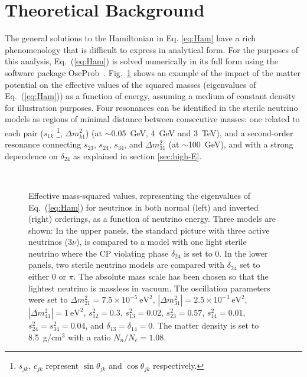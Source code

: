 \newcommand{\UNP}{U^{4\nu}}
\newcommand{\USM}{U^{3\nu}}

\section{Theoretical Background}
\label{sec:phenomeno}
The general solutions to the Hamiltonian in Eq. \ref{eq:Ham} have a rich phenomenology that is difficult to express in analytical form. For the purposes of this analysis, Eq.~(\ref{eq:Ham}) is solved numerically in its full form using the software package OscProb~\cite{OscProb}. Fig.~\ref{fig:massres} shows an example of the impact of the matter potential on the effective values of the squared masses (eigenvalues of Eq.~(\ref{eq:Ham})) as a function of energy, assuming a medium of constant density for illustration purposes. Four resonances can be identified in the sterile neutrino models as regions of minimal distance between consecutive masses: one related to each pair ($s_{1k}$ \footnote{$s_{jk}$, $c_{jk}$ represent $\sin\theta_{jk}$ and $\cos\theta_{jk}$ respectively.}, $\Delta{m^2_{k1}}$) (at $\sim$0.05~GeV, 4~GeV and 3~TeV), and a second-order resonance connecting $s_{23}$, $s_{24}$, $s_{34}$, and $\Delta{m^2_{31}}$ (at $\sim$100~GeV), and with a strong dependence on $\delta_{24}$ as explained in section \ref{sec:high-E}.
\begin{figure}
    \centering
    \\
    \caption{Effective mass-squared values, representing the eigenvalues of Eq.~(\ref{eq:Ham}) for neutrinos in both normal (left) and inverted (right) orderings, as a function of neutrino energy. Three models are shown: In the upper panels, the standard picture with three active neutrinos (3$\nu$), is compared to a model with one light sterile neutrino where the CP violating phase $\delta_{24}$ is set to $0$. In the lower panels, two sterile neutrino models are compared with $\delta_{24}$ set to either $0$ or $\pi$. The absolute mass scale has been chosen so that the lightest neutrino is massless in vacuum. The oscillation parameters were set to $\Delta{m^2_{21}}=7.5\times10^{-5}~\mathrm{eV}^2$, $|\Delta{m^2_{31}}|=2.5\times10^{-3}~\mathrm{eV}^2$, $|\Delta{m^2_{41}}|=1~\mathrm{eV}^2$, $s_{12}^2=0.3$, $s_{13}^2=0.02$, $s_{23}^2=0.57$, $s_{14}^2=0.01$, $s_{24}^2=s_{34}^2=0.04$, and $\delta_{13}=\delta_{14}=0$. The matter density is set to 8.5~g/cm$^3$ with a ratio $N_n/N_e=1.08$.}
    \label{fig:massres}
\end{figure}
